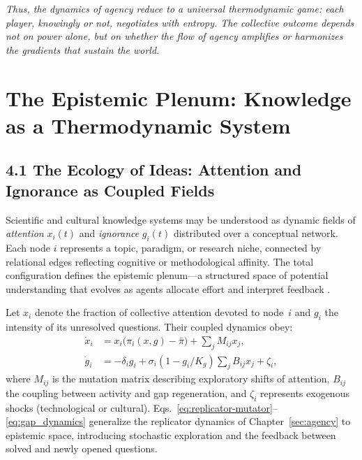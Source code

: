 \documentclass[11pt,a4paper,titlepage]{article}
\theoremstyle{definition}
\begin{document}
\bigskip
\noindent
\textit{Thus, the dynamics of agency reduce to a universal thermodynamic
game: each player, knowingly or not, negotiates with entropy.
The collective outcome depends not on power alone, but on whether the flow of
agency amplifies or harmonizes the gradients that sustain the world.}

\section{The Epistemic Plenum: Knowledge as a Thermodynamic System}
\label{sec:epistemic}

\subsection{4.1 The Ecology of Ideas: Attention and Ignorance as Coupled Fields}

Scientific and cultural knowledge systems may be understood as dynamic fields of
\emph{attention} $x_i(t)$ and \emph{ignorance} $g_i(t)$ distributed over a
conceptual network.  Each node $i$ represents a topic, paradigm, or research
niche, connected by relational edges reflecting cognitive or methodological
affinity.  The total configuration defines the epistemic plenum—a structured
space of potential understanding that evolves as agents allocate effort and
interpret feedback \cite{kuhn1962,popper1959,arthur1994,holland2012}.

Let $x_i$ denote the fraction of collective attention devoted to node~$i$ and
$g_i$ the intensity of its unresolved questions.  Their coupled dynamics obey:
\begin{align}
\dot{x}_i &= x_i \big(\pi_i(x,g) - \bar{\pi}\big) + 
            \sum_j M_{ij}x_j, \label{eq:replicator-mutator}\\
\dot{g}_i &= -\delta_i g_i 
            + \sigma_i(1 - g_i/K_g)\sum_j B_{ij}x_j
            + \zeta_i, \label{eq:gap_dynamics}
\end{align}
where $M_{ij}$ is the mutation matrix describing exploratory shifts of
attention, $B_{ij}$ the coupling between activity and gap regeneration,
and $\zeta_i$ represents exogenous shocks (technological or cultural).
Eqs.~\eqref{eq:replicator-mutator}–\eqref{eq:gap_dynamics} generalize the
replicator dynamics of Chapter~\ref{sec:agency} to epistemic space, introducing
stochastic exploration and the feedback between solved and newly opened
questions.
\end{document}

